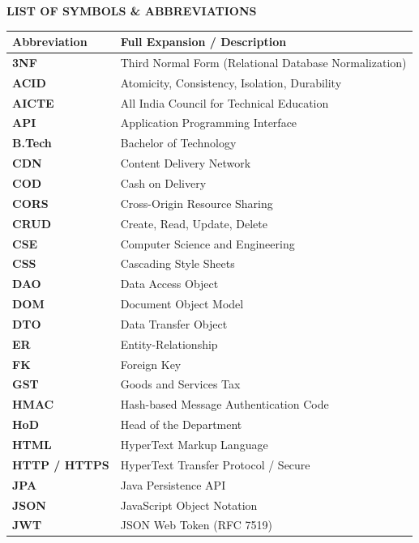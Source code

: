 \newpage
\thispagestyle{fancy}
\begin{center}
    {\fontsize{16}{20}\selectfont \textbf{LIST OF SYMBOLS \& ABBREVIATIONS}}\\[0.8cm]
\end{center}

\begin{table}[H]
\centering
\begin{tabularx}{\textwidth}{p{3.2cm}X}
\toprule
\textbf{Abbreviation} & \textbf{Full Expansion / Description} \\
\midrule
\textbf{3NF} & Third Normal Form (Relational Database Normalization) \\
\textbf{ACID} & Atomicity, Consistency, Isolation, Durability \\
\textbf{AICTE} & All India Council for Technical Education \\
\textbf{API} & Application Programming Interface \\
\textbf{B.Tech} & Bachelor of Technology \\
\textbf{CDN} & Content Delivery Network \\
\textbf{COD} & Cash on Delivery \\
\textbf{CORS} & Cross-Origin Resource Sharing \\
\textbf{CRUD} & Create, Read, Update, Delete \\
\textbf{CSE} & Computer Science and Engineering \\
\textbf{CSS} & Cascading Style Sheets \\
\textbf{DAO} & Data Access Object \\
\textbf{DOM} & Document Object Model \\
\textbf{DTO} & Data Transfer Object \\
\textbf{ER} & Entity-Relationship \\
\textbf{FK} & Foreign Key \\
\textbf{GST} & Goods and Services Tax \\
\textbf{HMAC} & Hash-based Message Authentication Code \\
\textbf{HoD} & Head of the Department \\
\textbf{HTML} & HyperText Markup Language \\
\textbf{HTTP / HTTPS} & HyperText Transfer Protocol / Secure \\
\textbf{JPA} & Java Persistence API \\
\textbf{JSON} & JavaScript Object Notation \\
\textbf{JWT} & JSON Web Token (RFC 7519) \\

\end{tabularx}
\end{table}
